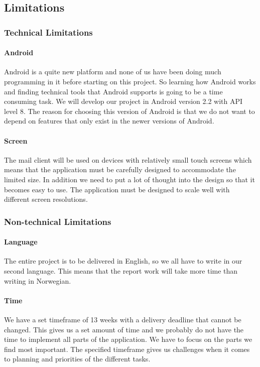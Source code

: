 \subsection{Limitations}

\subsubsection{Technical Limitations}

\paragraph{Android}
Android is a quite new platform and none of us have been doing much programming in it before starting on this project. So learning how Android works and finding technical tools that Android supports is going to be a time consuming task. We will develop our project in Android version 2.2 with API level 8. The reason for choosing this version of Android is that we do not want to depend on features that only exist in the newer versions of Android. 

\paragraph{Screen}
The mail client will be used on devices with relatively small touch screens which means that the application must be carefully designed to accommodate the limited size. In addition we need to put a lot of thought into the design so that it becomes easy to use. The application must be designed to scale well with different screen resolutions.

\subsubsection{Non-technical Limitations}

\paragraph{Language}
The entire project is to be delivered in English, so we all have to write in our second language. This means that the report work will take more time than writing in Norwegian. 

\paragraph{Time}
We have a set timeframe of 13 weeks with a delivery deadline that cannot be changed. This gives us a set amount of time and we probably do not have the time to implement all parts of the application. We have to focus on the parts we find most important. The specified timeframe gives us challenges when it comes to planning and priorities of the different tasks.